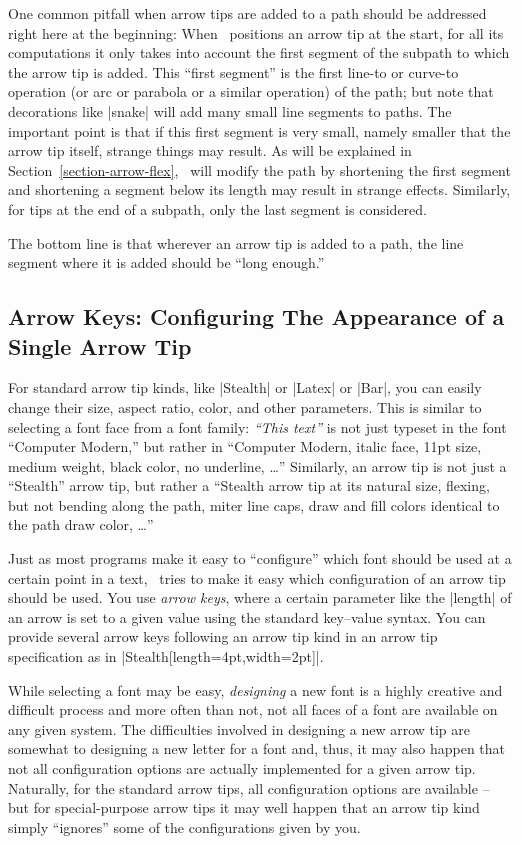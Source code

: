 One common pitfall when arrow tips are added to a path should be
addressed right here at the beginning: When \tikzname\ positions an
arrow tip at the start, for all its computations it only takes into
account the first segment of the subpath to which the arrow tip is
added. This ``first segment'' is the first line-to or curve-to operation (or arc
or parabola or a similar operation) of the path; but note that
decorations like |snake| will add many small line segments to
paths. The important point 
is that if this first segment is very small, namely smaller that the
arrow tip itself, strange things may result. As will be explained in
Section~\ref{section-arrow-flex}, \tikzname\ will modify the path by
shortening the first segment and shortening a segment below its length
may result in strange effects. Similarly, for tips at the end of a
subpath, only the last segment is considered.

The bottom line is that wherever an arrow tip is added to a path, the
line segment where it is added should be ``long enough.'' 


\subsection{Arrow Keys: Configuring The Appearance of a Single Arrow Tip}
\label{section-arrow-config}

For standard arrow tip kinds, like |Stealth| or |Latex| or |Bar|, 
you can easily change their size, aspect ratio, color, and other
parameters. This is similar to selecting a font face from a font
family: \emph{``This text''} is not just typeset in the font 
``Computer Modern,'' but rather in ``Computer Modern, italic face,
11pt size, medium weight, black color, no underline, \dots''
Similarly, an arrow tip is not just a ``Stealth'' arrow tip, but
rather a ``Stealth arrow tip at its natural size, flexing, but not
bending along the path, miter line caps, draw and fill colors
identical to the path draw color, \dots''

Just as most programs make it easy to ``configure'' which font should
be used at a certain point in a text, \tikzname\ tries to make it easy
which configuration of an arrow tip should be used. You use
\emph{arrow keys}, where a certain parameter like the |length| of an
arrow is set to a given value using the standard key--value
syntax. You can provide several arrow keys following an arrow tip kind
in  an arrow tip specification as in
|Stealth[length=4pt,width=2pt]|.

While selecting a font may be easy, \emph{designing} a new font is a
highly creative and difficult process and more often than not, not all
faces of a font are available on any given system. The difficulties
involved in designing a new arrow tip are somewhat to designing a new
letter for a font and, thus, it may also happen that not all
configuration options are actually implemented for a given arrow
tip. Naturally, for the standard arrow tips, all configuration options
are available -- but for special-purpose arrow tips it may well happen
that an arrow tip kind simply ``ignores'' some of the configurations
given by you.


